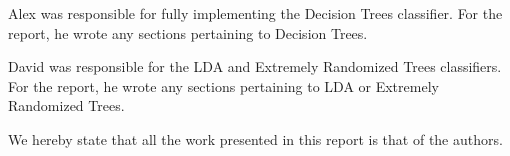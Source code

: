 \documentclass[conference]{IEEEtran}
\begin{document}
Alex was responsible for fully implementing the Decision Trees classifier. For the report, he wrote any sections pertaining to Decision Trees.

David was responsible for the LDA and Extremely Randomized Trees classifiers. For the report, he wrote any sections pertaining to LDA or Extremely Randomized Trees.

We hereby state that all the work presented in this report is that of the authors.





%
%


%
\end{document}
